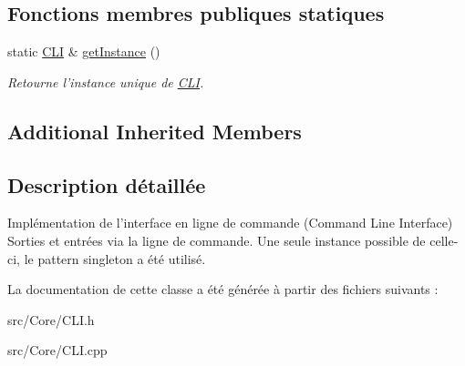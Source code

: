 \subsection*{Fonctions membres publiques statiques}
\begin{DoxyCompactItemize}
\item 
\hypertarget{classCLI_afb0099de9473ff74480fa40cec78a3ac}{static \hyperlink{classCLI}{C\-L\-I} \& \hyperlink{classCLI_afb0099de9473ff74480fa40cec78a3ac}{get\-Instance} ()}\label{classCLI_afb0099de9473ff74480fa40cec78a3ac}

\begin{DoxyCompactList}\small\item\em Retourne l'instance unique de \hyperlink{classCLI}{C\-L\-I}. \end{DoxyCompactList}\end{DoxyCompactItemize}
\subsection*{Additional Inherited Members}


\subsection{Description détaillée}
Implémentation de l'interface en ligne de commande (Command Line Interface) Sorties et entrées via la ligne de commande. Une seule instance possible de celle-\/ci, le pattern singleton a été utilisé. 

La documentation de cette classe a été générée à partir des fichiers suivants \-:\begin{DoxyCompactItemize}
\item 
src/\-Core/C\-L\-I.\-h\item 
src/\-Core/C\-L\-I.\-cpp\end{DoxyCompactItemize}
